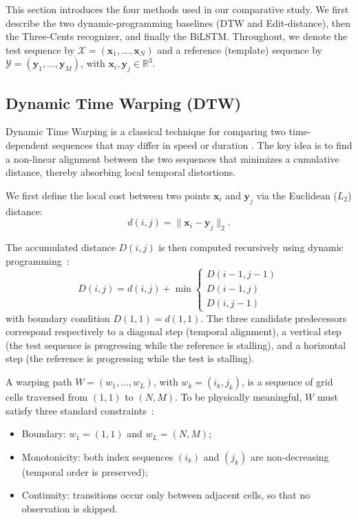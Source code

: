 
This section introduces the four methods used in our comparative study. We
first describe the two dynamic-programming baselines (DTW and Edit-distance),
then the Three-Cents recognizer, and finally the BiLSTM.
Throughout, we denote the test sequence by
$\mathcal{X} = (\mathbf{x}_1, \dots, \mathbf{x}_N)$ and a reference (template)
sequence by $\mathcal{Y} = (\mathbf{y}_1, \dots, \mathbf{y}_M)$, with
$\mathbf{x}_i, \mathbf{y}_j \in \mathbb{R}^{3}$.

\subsection{Dynamic Time Warping (DTW)}

Dynamic Time Warping is a classical technique for comparing two time-dependent
sequences that may differ in speed or duration
\cite{MyersRabiner1981}. The key idea is to find a non-linear
alignment between the two sequences that minimizes a cumulative distance,
thereby absorbing local temporal distortions.

We first define the local cost between two points $\mathbf{x}_i$ and
$\mathbf{y}_j$ via the Euclidean ($L_2$) distance:
\begin{equation}
    d(i, j) = \lVert \mathbf{x}_i - \mathbf{y}_j \rVert_2 .
\end{equation}

The accumulated distance $D(i, j)$ is then computed recursively using dynamic
programming~\cite{Rabiner1993}:
\begin{equation}
\label{eq:dtw-recurrence}
    D(i, j) = d(i, j) + \min
    \begin{cases}
        D(i-1, j-1) \\[2pt]
        D(i-1, j)   \\[2pt]
        D(i, j-1)
    \end{cases}
\end{equation}
with boundary condition $D(1, 1) = d(1, 1)$. The three candidate predecessors
correspond respectively to a diagonal step (temporal alignment), a vertical
step (the test sequence is progressing while the reference is stalling), and a
horizontal step (the reference is progressing while the test is stalling).

A warping path $W = (w_1, \dots, w_L)$, with $w_k = (i_k, j_k)$, is a sequence
of grid cells traversed from $(1,1)$ to $(N, M)$. To be physically meaningful,
$W$ must satisfy three standard constraints~\cite{Rabiner1993}:
\begin{itemize}\itemsep 0em
    \item Boundary: $w_1 = (1, 1)$ and $w_L = (N, M)$;
    \item Monotonicity: both index sequences $(i_k)$ and $(j_k)$ are
    non-decreasing (temporal order is preserved);
    \item Continuity: transitions occur only between adjacent cells, so
    that no observation is skipped.
\end{itemize}

